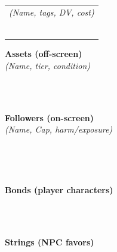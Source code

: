 \begin{tcolorbox}[
    enhanced, sharp corners, 
    colback=white, colframe=black!50, 
    title={\large\bfseries Rites / Songs / Spells}, 
    fonttitle=\bfseries,
    breakable
]
\vspace{2pt}
\begin{tabular}{p{\textwidth}}
\small
\emph{(Name, tags, DV, cost)} \\
\rule{0pt}{4ex}\\
\rule{0pt}{4ex}\\
\rule{0pt}{4ex}\\
\rule{0pt}{4ex}\\
\rule{0pt}{4ex}\\
\rule{0pt}{4ex}\\
\end{tabular}
\end{tcolorbox}

\begin{tcolorbox}[
    enhanced, sharp corners, 
    colback=white, colframe=black!50, 
    title={\large\bfseries Assets \& Followers}, 
    fonttitle=\bfseries,
    breakable
]
\small
\textbf{Assets (off-screen)} \hrulefill\\
\emph{(Name, tier, condition)} \\
\rule{0pt}{4ex}\\
\rule{0pt}{4ex}\\
\vspace{4pt}
\textbf{Followers (on-screen)} \hrulefill\\
\emph{(Name, Cap, harm/exposure)} \\
\rule{0pt}{4ex}\\
\rule{0pt}{4ex}\\
\end{tcolorbox}

\begin{tcolorbox}[
    enhanced, sharp corners, 
    colback=white, colframe=black!50, 
    title={\large\bfseries Bonds \& Strings}, 
    fonttitle=\bfseries,
    breakable
]
\small
\textbf{Bonds (player characters)} \\
\rule{0pt}{4ex}\\
\rule{0pt}{4ex}\\
\vspace{4pt}
\textbf{Strings (NPC favors)} \\
\rule{0pt}{4ex}\\
\rule{0pt}{4ex}\\
\end{tcolorbox}

